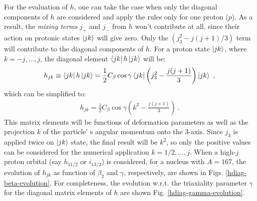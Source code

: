 For the evaluation of $h$, one can take the case when only the diagonal components of $h$ are considered and apply the rules only for one proton ($p$). As a result, the \emph{mixing terms} $j_+$ and $j_-$ from $h$ won't contribute at all, since their action on protonic states $\ket{jk}$ will give zero. Only the $(j_3^2-j(j+1)/3)$ term will contribute to the diagonal components of $h$. For a proton state $\ket{jk}$, where $k=-j,\dots,j$, the diagonal element $\bra{jk}h\ket{jk}$ will be:
\begin{align}
    h_{jk}\equiv\bra{jk}h\ket{jk}=\frac{1}{2}C_\beta\cos\gamma\bra{jk}\left(j_3^2-\frac{j(j+1)}{3}\right)\ket{jk}\ ,
\end{align}
which can be simplified to:
\begin{align}
    h_{jk}=\frac{1}{2}C_\beta\cos\gamma\left(k^2-\frac{j(j+1)}{3}\right)\ .
    \label{hdiag-equation}
\end{align}
This matrix elements will be functions of deformation parameters as well as the projection $k$ of the particle'
s angular momentum onto the $3$-axis. Since $j_3$ is applied twice on $\ket{jk}$ state, the final result will be $k^2$, so only the positive values can be considered for the numerical application $k=1/2,\dots,j$. When a high-$j$ proton orbital (say $h_{11/2}$ or $i_{13/2}$) is considered, for a nucleus with $A=167$, the evolution of $h_{jk}$ as function of $\beta_2$ and $\gamma$, respectively, are shown in Figs. \ref{hdiag-beta-evolution}. For completeness, the evolution w.r.t. the triaxiality parameter $\gamma$ for the diagonal matrix elements of $h$ are shown Fig. \ref{hdiag-gamma-evolution}.

